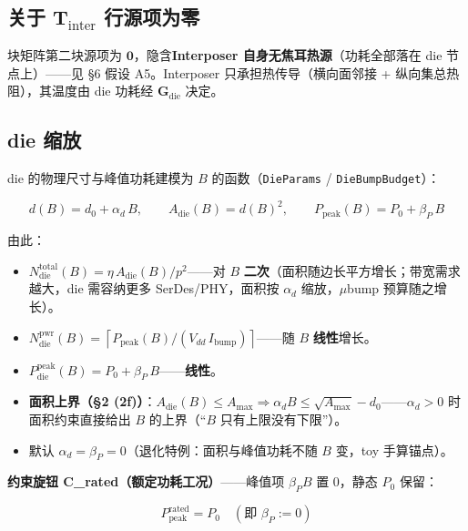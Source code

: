 \documentclass[11pt]{article}
\newcommand{\bv}{\mathbf}
\newcommand{\ceil}[1]{\left\lceil #1 \right\rceil}
\begin{document}
\subsection{关于 $\bv{T}_{\text{inter}}$ 行源项为零}

块矩阵第二块源项为 $\bv{0}$，隐含\textbf{Interposer 自身无焦耳热源}（功耗全部落在 die 节点上）——见 §6 假设 A5。Interposer 只承担热传导（横向面邻接 + 纵向集总热阻），其温度由 die 功耗经 $\bv{G}_{\text{die}}$ 决定。

\subsection{die 缩放}

die 的物理尺寸与峰值功耗建模为 $B$ 的函数（\texttt{DieParams} / \texttt{DieBumpBudget}）：

\begin{equation}
d(B) = d_0 + \alpha_d\,B,\qquad A_{\text{die}}(B) = d(B)^2,\qquad P_{\text{peak}}(B) = P_0 + \beta_P\,B
\end{equation}

由此：
\begin{itemize}
\item $N_{\text{die}}^{\text{total}}(B) = \eta\,A_{\text{die}}(B)/p^2$——对 $B$ \textbf{二次}（面积随边长平方增长；带宽需求越大，die 需容纳更多 SerDes/PHY，面积按 $\alpha_d$ 缩放，$\mu$bump 预算随之增长）。
\item $N_{\text{die}}^{\text{pwr}}(B) = \ceil{P_{\text{peak}}(B)/(V_{dd}\,I_{\text{bump}})}$——随 $B$ \textbf{线性}增长。
\item $P_{\text{die}}^{\text{peak}}(B) = P_0 + \beta_P\,B$——\textbf{线性}。
\item \textbf{面积上界（§2 (2f)）}：$A_{\text{die}}(B) \le A_{\max} \Rightarrow \alpha_d B \le \sqrt{A_{\max}} - d_0$——$\alpha_d > 0$ 时面积约束直接给出 $B$ 的上界（“$B$ 只有上限没有下限”）。
\item 默认 $\alpha_d = \beta_P = 0$（退化特例：面积与峰值功耗不随 $B$ 变，toy 手算锚点）。
\end{itemize}

\textbf{约束旋钮 C\_rated（额定功耗工况）}——峰值项 $\beta_P B$ 置 0，静态 $P_0$ 保留：

\begin{equation}
P_{\text{peak}}^{\text{rated}} = P_0 \quad (\text{即 } \beta_P := 0)
\end{equation}
\end{document}
